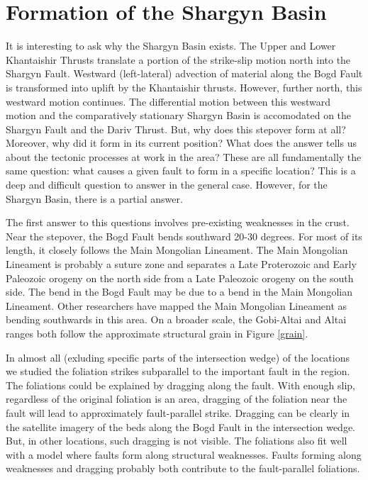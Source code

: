 \section{Formation of the Shargyn Basin}
	It is interesting to ask why the Shargyn Basin exists. The Upper and Lower Khantaishir Thrusts translate a portion of the strike-slip motion north into the Shargyn Fault. Westward (left-lateral) advection of material along the Bogd Fault is transformed into uplift by the Khantaishir thrusts. However, further north, this westward motion continues. The differential motion between this westward motion and the comparatively stationary Shargyn Basin is accomodated on the Shargyn Fault and the Dariv Thrust. But, why does this stepover form at all? Moreover, why did it form in its current position? What does the answer tells us about the tectonic processes at work in the area? These are all fundamentally the same question: what causes a given fault to form in a specific location? This is a deep and difficult question to answer in the general case. However, for the Shargyn Basin, there is a partial answer.

	The first answer to this questions involves pre-existing weaknesses in the crust. Near the stepover, the Bogd Fault bends southward 20-30 degrees. For most of its length, it closely follows the Main Mongolian Lineament. The Main Mongolian Lineament is probably a suture zone and separates a Late Proterozoic and Early Paleozoic orogeny on the north side from a Late Paleozoic orogeny on the south side. The bend in the Bogd Fault may be due to a bend in the Main Mongolian Lineament. Other researchers have mapped the Main Mongolian Lineament as bending southwards in this area. On a broader scale, the Gobi-Altai and Altai ranges both follow the approximate structural grain in Figure \ref{grain}.
	
	In almost all (exluding specific parts of the intersection wedge) of the locations we studied the foliation strikes subparallel to the important fault in the region.  The foliations could be explained by dragging along the fault. With enough slip, regardless of the original foliation is an area, dragging of the foliation near the fault will lead to approximately fault-parallel strike. Dragging can be clearly in the satellite imagery of the beds along the Bogd Fault in the intersection wedge. But, in other locations, such dragging is not visible. The foliations also fit well with a model where faults form along structural weaknesses. Faults forming along weaknesses and dragging probably both contribute to the fault-parallel foliations. 


